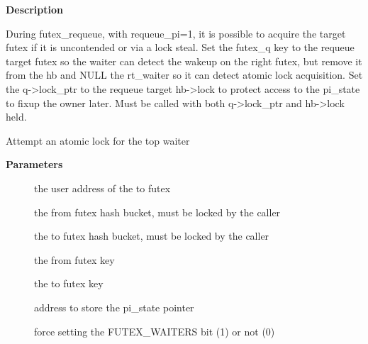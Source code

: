 \documentclass[a4paper,8pt,english]{sphinxmanual}
\begin{document}
\textbf{Description}

During futex\_requeue, with requeue\_pi=1, it is possible to acquire the
target futex if it is uncontended or via a lock steal.  Set the futex\_q key
to the requeue target futex so the waiter can detect the wakeup on the right
futex, but remove it from the hb and NULL the rt\_waiter so it can detect
atomic lock acquisition.  Set the q-\textgreater{}lock\_ptr to the requeue target hb-\textgreater{}lock
to protect access to the pi\_state to fixup the owner later.  Must be called
with both q-\textgreater{}lock\_ptr and hb-\textgreater{}lock held.

\begin{fulllineitems}
\label{kernel-hacking/locking:c.futex_proxy_trylock_atomic}
Attempt an atomic lock for the top waiter

\end{fulllineitems}


\textbf{Parameters}
\begin{description}
\item[{}] \leavevmode
the user address of the to futex

\item[{}] \leavevmode
the from futex hash bucket, must be locked by the caller

\item[{}] \leavevmode
the to futex hash bucket, must be locked by the caller

\item[{}] \leavevmode
the from futex key

\item[{}] \leavevmode
the to futex key

\item[{}] \leavevmode
address to store the pi\_state pointer

\item[{}] \leavevmode
force setting the FUTEX\_WAITERS bit (1) or not (0)

\end{description}
\end{document}
